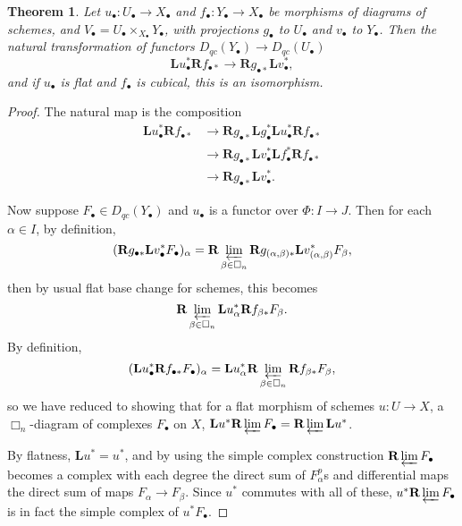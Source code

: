 \documentclass[proquest]{uwthesis}[2014/11/13]
\newtheorem{theorem}{Theorem}[section]
\theoremstyle{definition}
\newcommand{\bL}{\textbf{L}}
\newcommand{\bR}{\textbf{R}}
\begin{document}
\begin{theorem}
	\label{thm:flatbasechange}
	Let $u_\bullet : U_\bullet \rightarrow X_\bullet$ and $f_\bullet : Y_\bullet \rightarrow X_\bullet$ be morphisms of diagrams of schemes, and $V_\bullet = U_\bullet \times_{X_\bullet} Y_\bullet$, with projections $g_\bullet$ to $U_\bullet$ and $v_\bullet$ to $Y_\bullet$.
	Then the natural transformation of functors $D_{qc}(Y_\bullet) \rightarrow D_{qc}(U_\bullet)$
	\[
		\bL u_\bullet^* \bR f_{\bullet *} \rightarrow \bR g_{\bullet *} \bL v_\bullet^*,
	\]
	and if $u_\bullet$ is flat and $f_\bullet$ is cubical, this is an isomorphism.
\end{theorem}
\begin{proof}
	The natural map is the composition
	\begin{align*}
		\bL u_\bullet^* \bR f_{\bullet *} &\rightarrow \bR g_{\bullet *} \bL g_\bullet^* \bL u_\bullet^* \bR f_{\bullet *} \\
		&\rightarrow \bR g_{\bullet *} \bL v_\bullet^* \bL f_\bullet^* \bR f_{\bullet *} \\
		&\rightarrow \bR g_{\bullet *} \bL v_\bullet^*.
	\end{align*}
	
	Now suppose $F_\bullet \in D_{qc}(Y_\bullet)$ and $u_\bullet$ is a functor over $\Phi : I \rightarrow J$.
	Then for each $\alpha \in I$, by definition,
	\[
		(\bR g_{\bullet *} \bL v_\bullet^* F_\bullet)_\alpha = \bR \varprojlim_{\beta \in \Box_n} \bR g_{(\alpha, \beta) *} \bL v_{(\alpha, \beta)}^* F_\beta,
	\]
	then by usual flat base change for schemes, this becomes
	\[
		 \bR \varprojlim_{\beta \in \Box_n} \bL u_{\alpha}^*  \bR f_{\beta *} F_\beta.
	\]
	By definition,
	\[
		(\bL u_\bullet^* \bR f_{\bullet *} F_\bullet)_\alpha = \bL u_\alpha^* \bR \varprojlim_{\beta \in \Box_n} \bR f_{\beta *} F_\beta,
	\]
	so we have reduced to showing that for a flat morphism of schemes $u : U \rightarrow X$, a $\Box_n$-diagram of complexes $F_\bullet$ on $X$, $\bL u^* \bR \varprojlim F_\bullet = \bR \varprojlim \bL u^*$.
	
	By flatness, $\bL u^* = u^*$, and by using the simple complex construction $\bR \varprojlim F_\bullet$ becomes a complex with each degree the direct sum of $F_\alpha^p$s and differential maps the direct sum of maps $F_\alpha \rightarrow F_\beta$.
	Since $u^*$ commutes with all of these, $u^* \bR \varprojlim F_\bullet$ is in fact the simple complex of $u^* F_\bullet$.
\end{proof}
\end{document}
